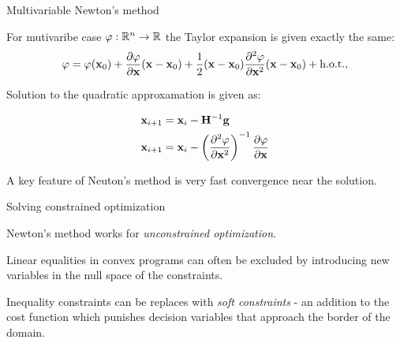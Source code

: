 \documentclass{beamer}
\begin{document}
\begin{frame}{Multivariable Newton's method}
	\begin{flushleft}
		
		For mutivaribe case $\varphi: \mathbb{R}^n \rightarrow \mathbb{R}$ the Taylor expansion is given exactly the same:
		\begin{equation}
			\varphi = \varphi(\mathbf{x}_0) + \frac{\partial \varphi}{\partial \mathbf{x}} (\mathbf{x} - \mathbf{x}_0)
			+ \frac{1}{2} (\mathbf{x} - \mathbf{x}_0) \frac{\partial^2 \varphi}{\partial \mathbf{x}^2} (\mathbf{x} - \mathbf{x}_0)
			+ \text{h.o.t.},
		\end{equation}
		
		Solution to the quadratic approxamation is given as:
		
		\begin{align}
			\mathbf{x}_{i+1} &= \mathbf{x}_i  - \mathbf{H}^{-1} \mathbf{g}
			\\
			\mathbf{x}_{i+1} &= \mathbf{x}_i  - \left(\frac{\partial^2 \varphi}{\partial \mathbf{x}^2} \right)^{-1} 
													 \frac{\partial \varphi}{\partial \mathbf{x}} 
		\end{align}
		
		A key feature of Neuton's method is very fast convergence near the solution.
		
	\end{flushleft}
\end{frame}






\begin{frame}{Solving constrained optimization}
	\begin{flushleft}
		
		Newton's method works for \emph{unconstrained optimization}.
		
		\bigskip
		
		Linear equalities in convex programs can often be excluded by introducing new variables in the null space of the constraints.
		
		\bigskip
		
		Inequality constraints can be replaces with \emph{soft constraints} - an addition to the cost function which punishes decision variables that approach the border of the domain. 
		
	\end{flushleft}
\end{frame}
\end{document}
